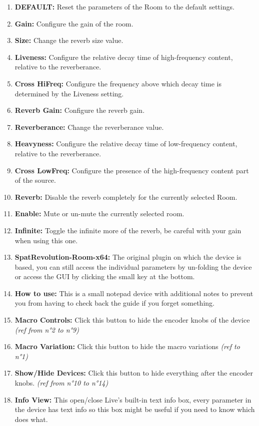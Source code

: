 \documentclass[
  letterpaper,
  DIV=11,
  numbers=noendperiod]{scrreport}
\providecommand{\tightlist}{%
  \setlength{\itemsep}{0pt}\setlength{\parskip}{0pt}}\usepackage{longtable,booktabs,array}
\begin{document}
\begin{enumerate}
\def\labelenumi{\arabic{enumi}.}
\tightlist
\item
  \textbf{DEFAULT:} Reset the parameters of the Room to the default
  settings.
\item
  \textbf{Gain:} Configure the gain of the room.
\item
  \textbf{Size:} Change the reverb size value.
\item
  \textbf{Liveness:} Configure the relative decay time of high-frequency
  content, relative to the reverberance.
\item
  \textbf{Cross HiFreq:} Configure the frequency above which decay time
  is determined by the Liveness setting.
\item
  \textbf{Reverb Gain:} Configure the reverb gain.
\item
  \textbf{Reverberance:} Change the reverberance value.
\item
  \textbf{Heavyness:} Configure the relative decay time of low-frequency
  content, relative to the reverberance.
\item
  \textbf{Cross LowFreq:} Configure the presence of the high-frequency
  content part of the source.
\item
  \textbf{Reverb:} Disable the reverb completely for the currently
  selected Room.
\item
  \textbf{Enable:} Mute or un-mute the currently selected room.
\item
  \textbf{Infinite:} Toggle the infinite more of the reverb, be careful
  with your gain when using this one.
\item
  \textbf{SpatRevolution-Room-x64:} The original plugin on which the
  device is based, you can still access the individual parameters by
  un-folding the device or access the GUI by clicking the small key at
  the bottom.
\item
  \textbf{How to use:} This is a small notepad device with additional
  notes to prevent you from having to check back the guide if you forget
  something.
\item
  \textbf{Macro Controls:} Click this button to hide the encoder knobs
  of the device \emph{(ref from n°2 to n°9)}
\item
  \textbf{Macro Variation:} Click this button to hide the macro
  variations \emph{(ref to n°1)}
\item
  \textbf{Show/Hide Devices:} Click this button to hide everything after
  the encoder knobs. \emph{(ref from n°10 to n°14)}
\item
  \textbf{Info View:} This open/close Live's built-in text info box,
  every parameter in the device has text info so this box might be
  useful if you need to know which does what.
\end{enumerate}
\end{document}
